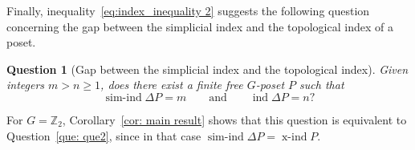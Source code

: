 \documentclass[preprint,12pt]{article}
\renewcommand{\ge}{\geqslant}
\newtheorem{question}[theorem]{Question}
\theoremstyle{definition}
\theoremstyle{remark}
\numberwithin{equation}{section}
\DeclareMathOperator{\ind}{ind}
\DeclareMathOperator{\xind}{x-ind}
\DeclareMathOperator{\sind}{sim-ind}
\begin{document}
Finally, inequality~\eqref{eq:index_inequality 2} suggests the following question concerning the gap between the simplicial index and the topological index of a poset.

\begin{question}[Gap between the simplicial index and the topological index]
\label{que:index_gap index & simplicial index}
Given integers \(m>n\ge 1\), does there exist a finite free \(G\)-poset \(P\) such that
\[
\sind \Delta P=m
\qquad\text{and}\qquad
\ind \Delta P=n?
\]
\end{question}

For \(G=\mathbb Z_2\), Corollary~\ref{cor: main result} shows that this question is equivalent to Question~\ref{que: que2}, since in that case \(\sind \Delta P=\xind P\).









\end{document}
